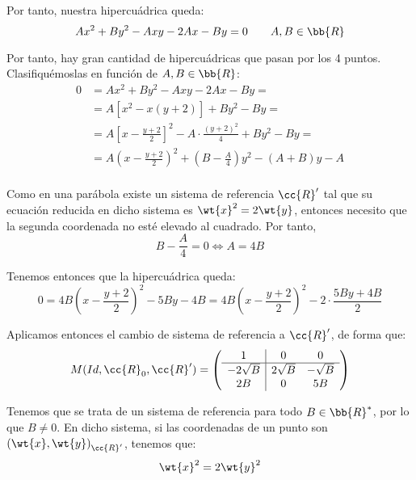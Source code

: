 \begin{ejercicio}
    Por tanto, nuestra hipercuádrica queda:
    \begin{equation*}
        Ax^2+By^2-Axy-2Ax-By=0 \qquad A,B\in \bb{R}
    \end{equation*}

    Por tanto, hay gran cantidad de hipercuádricas que pasan por los 4 puntos. Clasifiquémoslas en función de $A,B\in \bb{R}$:
    \begin{equation*}
        \begin{split}
            0 &= Ax^2+By^2-Axy-2Ax-By =\\
            &= A[x^2-x(y+2)]+By^2-By =\\
            &= A\left[x-\frac{y+2}{2}\right]^2 - A\cdot \frac{(y+2)^2}{4} +By^2-By =\\
            &= A\left(x-\frac{y+2}{2}\right)^2 + \left(B-\frac{A}{4}\right)y^2 -(A+B)y -A\\
        \end{split}
    \end{equation*}

    Como en una parábola existe un sistema de referencia $\cc{R}'$ tal que su ecuación reducida en dicho sistema es $\wt{x}^2=2\wt{y}$, entonces necesito que la segunda coordenada no esté elevado al cuadrado. Por tanto,
    \begin{equation*}
        B-\frac{A}{4} = 0 \Longleftrightarrow A=4B
    \end{equation*}

    Tenemos entonces que la hipercuádrica queda:
    \begin{equation*}
        0 = 4B\left(x-\frac{y+2}{2}\right)^2 -5By -4B
        = 4B\left(x-\frac{y+2}{2}\right)^2 -2\cdot \frac{5By+4B}{2}
    \end{equation*}

    Aplicamos entonces el cambio de sistema de referencia a $\cc{R}'$, de forma que:
    \begin{equation*}
        M(Id, \cc{R}_0, \cc{R}') = \left(\begin{array}{c|cc}
            1 & 0 & 0 \\ \hline
            -2\sqrt{B} & 2\sqrt{B} & -\sqrt{B}\\ 
            2B & 0 & 5B
        \end{array}\right)
    \end{equation*}

    Tenemos que se trata de un sistema de referencia para todo $B\in \bb{R}^\ast$, por lo que $B\neq 0$. En dicho sistema, si las coordenadas de un punto son ${(\wt{x}, \wt{y})}_{\cc{R}'}$, tenemos que:
    \begin{equation*}
        \wt{x}^2 = 2\wt{y}^2
    \end{equation*}


\end{ejercicio}
